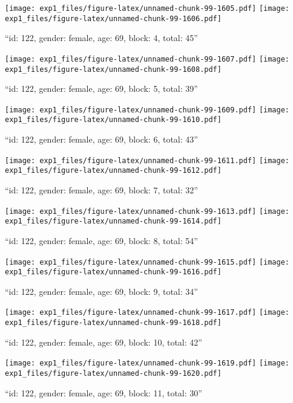 \documentclass[,]{article}
\begin{document}
\texttt{[image: exp1\_files/figure-latex/unnamed-chunk-99-1605.pdf]}
\texttt{[image: exp1\_files/figure-latex/unnamed-chunk-99-1606.pdf]}

\newpage
[1] 

``id: 122, gender: female, age: 69, block: 4, total: 45''

\texttt{[image: exp1\_files/figure-latex/unnamed-chunk-99-1607.pdf]}
\texttt{[image: exp1\_files/figure-latex/unnamed-chunk-99-1608.pdf]}

\newpage
[1] 

``id: 122, gender: female, age: 69, block: 5, total: 39''

\texttt{[image: exp1\_files/figure-latex/unnamed-chunk-99-1609.pdf]}
\texttt{[image: exp1\_files/figure-latex/unnamed-chunk-99-1610.pdf]}

\newpage
[1] 

``id: 122, gender: female, age: 69, block: 6, total: 43''

\texttt{[image: exp1\_files/figure-latex/unnamed-chunk-99-1611.pdf]}
\texttt{[image: exp1\_files/figure-latex/unnamed-chunk-99-1612.pdf]}

\newpage
[1] 

``id: 122, gender: female, age: 69, block: 7, total: 32''

\texttt{[image: exp1\_files/figure-latex/unnamed-chunk-99-1613.pdf]}
\texttt{[image: exp1\_files/figure-latex/unnamed-chunk-99-1614.pdf]}

\newpage
[1] 

``id: 122, gender: female, age: 69, block: 8, total: 54''

\texttt{[image: exp1\_files/figure-latex/unnamed-chunk-99-1615.pdf]}
\texttt{[image: exp1\_files/figure-latex/unnamed-chunk-99-1616.pdf]}

\newpage
[1] 

``id: 122, gender: female, age: 69, block: 9, total: 34''

\texttt{[image: exp1\_files/figure-latex/unnamed-chunk-99-1617.pdf]}
\texttt{[image: exp1\_files/figure-latex/unnamed-chunk-99-1618.pdf]}

\newpage
[1] 

``id: 122, gender: female, age: 69, block: 10, total: 42''

\texttt{[image: exp1\_files/figure-latex/unnamed-chunk-99-1619.pdf]}
\texttt{[image: exp1\_files/figure-latex/unnamed-chunk-99-1620.pdf]}

\newpage
[1] 

``id: 122, gender: female, age: 69, block: 11, total: 30''
\end{document}
